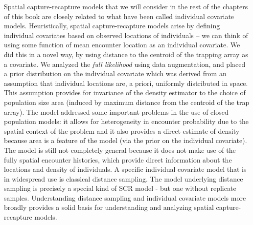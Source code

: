 Spatial capture-recapture models that we will consider in the rest of
the chapters of this book are closely related to what have been called
individual covariate models. Heuristically, spatial capture-recapture
models arise by defining individual covariates based on observed
locations of individuals -- we can think of using some function of
mean encounter location as an individual covariate. We did this in a
novel way, by using distance to the centroid of the trapping array as
a covariate. We analyzed the {\it full likelihood} using data
augmentation, and placed a prior distribution on the individual
covariate which was derived from an assumption that individual
locations are, a priori, uniformly distributed in space. This
assumption provides for invariance of the density estimator to the
choice of population size area (induced by maximum distance from the
centroid of the trap array). The model addressed some important problems in the
use of closed population models: it allows for heterogeneity in
encounter probability due to the spatial context of the problem and it
also provides a direct estimate of density because area is a feature
of the model (via the prior on the individual covariate). The model is
still not completely general because it does not make use of
the fully spatial encounter histories, which provide direct
information about the locations and density of individuals.  A
specific individual covariate model that is in widespread use is
classical distance sampling. The model underlying distance
sampling is precisely a special kind of SCR model - but one without
replicate samples. Understanding distance sampling and individual
covariate models more broadly provides a solid basis for understanding
and analyzing spatial capture-recapture models.

